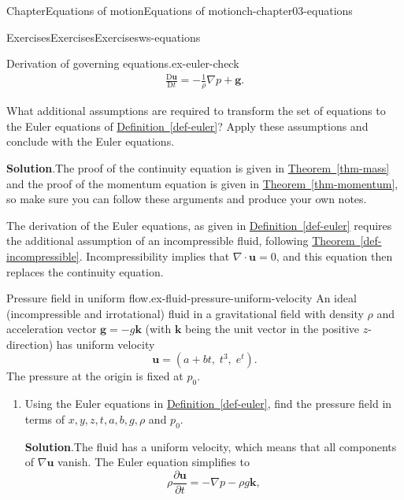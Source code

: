 \documentclass[oneside,10pt,]{book}
\newcommand{\blocktitlefont}{\relax}
\newcommand{\xreffont}{\relax}
\numberwithin{equation}{section}
\newcommand{\DD}[2]{\frac{\mathrm{D}#1}{\mathrm{D}#2}}
\newcommand{\pd}[2]{\frac{\partial#1}{\partial#2}}
\newcommand{\bu}{\boldsymbol{u}}
\newcommand{\bg}{\boldsymbol{g}}
\newcommand{\bk}{\boldsymbol{k}}
\begin{document}
\begin{chapterptx}{Chapter}{Equations of motion}{}{Equations of motion}{}{}{ch-chapter03-equations}
\begin{exercises-section}{Exercises}{Exercises}{}{Exercises}{}{}{ws-equations}
\begin{divisionexercise}{4}{Derivation of governing equations.}{}{ex-euler-check}
\begin{gather}
\DD{\bu}{t} = -\frac{1}{\rho} \nabla p + \bg. \label{ex-euler-check-2-2-2-2}
\end{gather}
%
\par
What additional assumptions are required to transform the set of equations to the Euler equations of \hyperref[def-euler]{Definition~{\xreffont\ref{def-euler}}}? Apply these assumptions and conclude with the Euler equations.%
\par\smallskip%
\noindent\textbf{\blocktitlefont Solution}.\hypertarget{ex-euler-check-3}{}\quad{}The proof of the continuity equation is given in \hyperref[thm-mass]{Theorem~{\xreffont\ref{thm-mass}}} and the proof of the momentum equation is given in \hyperref[thm-momentum]{Theorem~{\xreffont\ref{thm-momentum}}}, so make sure you can follow these arguments and produce your own notes.%
\par
The derivation of the Euler equations, as given in \hyperref[def-euler]{Definition~{\xreffont\ref{def-euler}}} requires the additional assumption of an incompressible fluid, following \hyperref[def-incompressible]{Theorem~{\xreffont\ref{def-incompressible}}}. Incompressibility implies that \(\nabla \cdot \bu = 0\), and this equation then replaces the continuity equation.%
\end{divisionexercise}%
\begin{divisionexercise}{5}{Pressure field in uniform flow.}{}{ex-fluid-pressure-uniform-velocity}%
An ideal (incompressible and irrotational) fluid in a gravitational field with density \(\rho\) and acceleration vector \(\bg = -g \bk\) (with \(\bk\) being the unit vector in the positive \(z\)-direction) has uniform velocity%
\begin{equation*}
\bu = (a + b t, \; t^3, \; e^t).
\end{equation*}
The pressure at the origin is fixed at \(p_0\).%
\begin{enumerate}[font=\bfseries,label=(\alph*),ref=\alph*]%
\item{}Using the Euler equations in \hyperref[def-euler]{Definition~{\xreffont\ref{def-euler}}}, find the pressure field in terms of \(x, y, z, t, a, b, g, \rho\) and \(p_0\).%
\par\smallskip%
\noindent\textbf{\blocktitlefont Solution}.\hypertarget{ex-fluid-pressure-uniform-velocity-3-2}{}\quad{}The fluid has a uniform velocity, which means that all components of \(\nabla\bu\) vanish. The Euler equation simplifies to%
\begin{equation*}
\rho\pd{\bu}{t}=-\nabla p-\rho g \bk,
\end{equation*}

\end{enumerate}
\end{divisionexercise}
\end{exercises-section}
\end{chapterptx}
\end{document}
